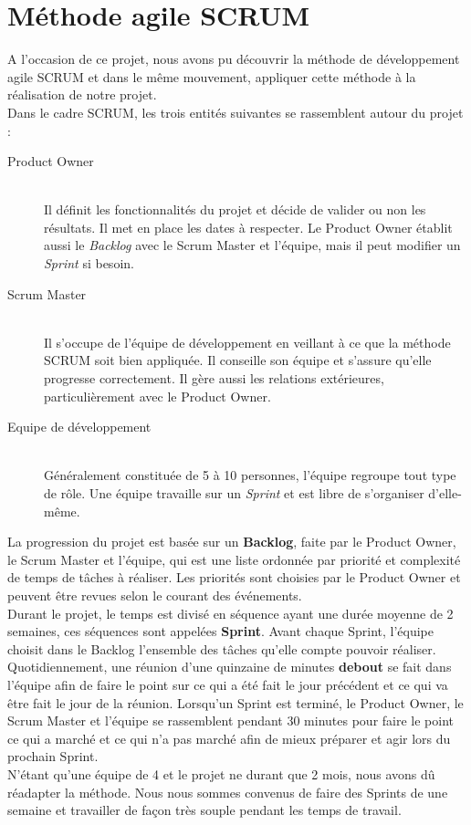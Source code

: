 \section{Méthode agile SCRUM}

A l'occasion de ce projet, nous avons pu découvrir la méthode de développement
 agile SCRUM  et dans le même mouvement, appliquer cette méthode à la réalisation de notre projet.\\
 
Dans le cadre SCRUM, les trois entités suivantes se rassemblent autour du projet :

\begin{description}
	\item[Product Owner] \hfill \\
		Il définit les fonctionnalités du projet et décide de valider ou non les résultats. Il met en place les dates à respecter. Le Product Owner établit aussi le \textit{Backlog} avec le Scrum Master et l'équipe, mais il peut modifier un \textit{Sprint} si besoin.
	\item[Scrum Master] \hfill \\
		Il s'occupe de l'équipe de développement en veillant à ce que la méthode SCRUM soit bien appliquée. Il conseille son équipe et s'assure qu'elle progresse correctement. Il gère aussi les relations extérieures, particulièrement avec le Product Owner.
	\item[Equipe de développement] \hfill \\
		Généralement constituée de 5 à 10 personnes, l'équipe regroupe tout type de rôle. Une équipe travaille sur un \textit{Sprint} et est libre de s'organiser d'elle-même.
\end{description}

La progression du projet est basée sur un \textbf{Backlog}, faite par le Product Owner, le Scrum Master et l'équipe, qui est une liste ordonnée par priorité et complexité de temps de tâches à réaliser. Les priorités sont choisies par le Product Owner et peuvent être revues selon le courant des événements. \\

Durant le projet, le temps est divisé en séquence ayant une durée moyenne de 2 semaines, ces séquences sont appelées \textbf{Sprint}. Avant chaque Sprint, l'équipe choisit dans le Backlog l'ensemble des tâches qu'elle compte pouvoir réaliser. \\

Quotidiennement, une réunion d'une quinzaine de minutes \textbf{debout} se fait dans l'équipe afin de faire le point sur ce qui a été fait le jour précédent et ce qui va être fait le jour de la réunion. Lorsqu'un Sprint est terminé, le Product Owner, le Scrum Master et l'équipe se rassemblent pendant 30 minutes pour faire le point ce qui a marché et ce qui n'a pas marché afin de mieux préparer et agir lors du prochain Sprint. \\

N'étant qu'une équipe de 4 et le projet ne durant que 2 mois, nous avons dû réadapter la méthode. Nous nous sommes convenus de faire des Sprints de une semaine et travailler de façon très souple pendant les temps de travail.